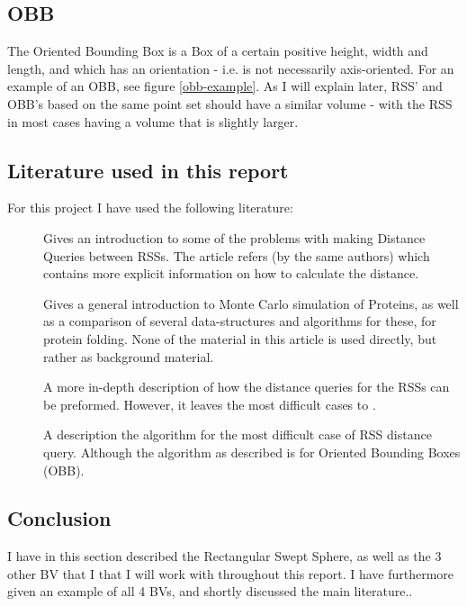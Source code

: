\subsection{OBB}
The Oriented Bounding Box is a Box of a certain positive height, width and length, and which has an orientation - i.e. is not necessarily axis-oriented. For an example of an OBB, see figure \ref{obb-example}. As I will explain later, RSS' and OBB's based on the same point set should have a similar volume - with the RSS in most cases having a volume that is slightly larger. 

\subsection{Literature used in this report}
For this project I have used the following literature:
\begin{description}
\item[\cite{larsen00fast}] Gives an introduction to some of the problems with making Distance Queries between RSSs. The article refers \cite{Larsen99fastproximity} (by the same authors) which contains more explicit information on how to calculate the distance. 
\item[\cite{Lotan03algorithmand}] Gives a general introduction to Monte Carlo simulation of Proteins, as well as a comparison of several data-structures and algorithms for these, for protein folding. None of the material in this article is used directly, but rather as background material.
\item[\cite{Larsen99fastproximity}] A more in-depth description of how the distance queries for the RSSs can be preformed. However, it leaves the most difficult cases to \cite{237244}.
\item[\cite{237244}] A description the algorithm for the most difficult case of RSS distance query. Although the algorithm as described is for Oriented Bounding Boxes (OBB).
\end{description}

\subsection{Conclusion}
I have in this section described the Rectangular Swept Sphere, as well as the 3 other BV that I that I will work with throughout this report. I have furthermore given an example of all 4 BVs, and shortly discussed the main literature..
